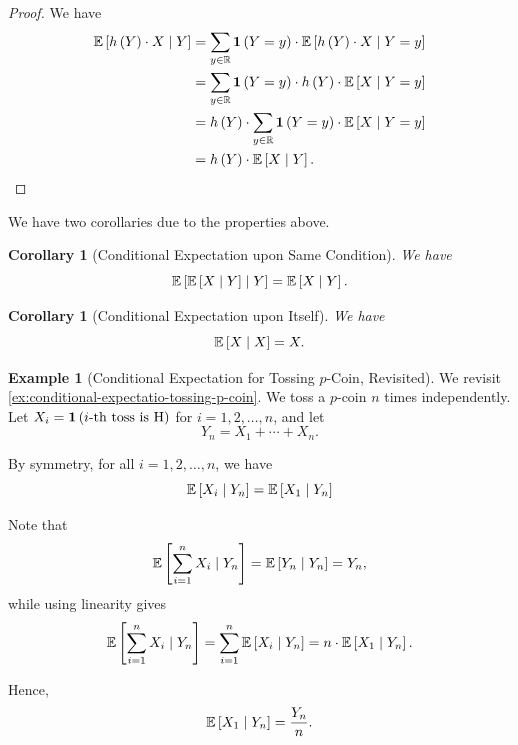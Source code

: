 \documentclass{article}
\newtheorem{corollary}[theorem]{Corollary}
\theoremstyle{definition}
\newtheorem{example}[theorem]{Example}
\theoremstyle{remark}
\newcommand{\RR}{\mathbb{R}}
\newcommand{\Expt}{\mathbb{E}}
\newcommand{\Conditional}[2]{#1\mid #2}
\newcommand{\indicator}{\mathbf{1}}
\begin{document}
\begin{proof}
    We have
    \begin{align*}
        \Expt\bqty{\Conditional{h\pqty{Y} \cdot X}{Y}} &= \sum_{y \in \RR} \indicator\pqty{Y = y} \cdot \Expt\bqty{\Conditional{h\pqty{Y} \cdot X}{Y = y}} \\
        &= \sum_{y \in \RR} \indicator\pqty{Y = y} \cdot h\pqty{Y} \cdot \Expt\bqty{\Conditional{X}{Y = y}} \\
        &= h\pqty{Y} \cdot \sum_{y \in \RR} \indicator\pqty{Y = y} \cdot \Expt\bqty{\Conditional{X}{Y = y}} \\
        &= h\pqty{Y} \cdot \Expt\bqty{\Conditional{X}{Y}}.
    \end{align*}
\end{proof}

We have two corollaries due to the properties above.

\begin{corollary}[Conditional Expectation upon Same Condition]
    \label{cor:conditional-expecation-upon-same-condition}%
    We have
    \[
        \Expt\bqty{\Conditional{\Expt\bqty{\Conditional{X}{Y}}}{Y}} = \Expt\bqty{\Conditional{X}{Y}}.
    \]
\end{corollary}

\begin{corollary}[Conditional Expectation upon Itself]
    \label{cor:conditional-expectation-upon-itself}%
    We have
    \[
        \Expt\bqty{\Conditional{X}{X}} = X.
    \]    
\end{corollary}

\begin{example}[Conditional Expectation for Tossing \(p\)-Coin, Revisited]
    \label{ex:conditional-expectatio-tossing-p-coin-revisited}%
    We revisit \autoref{ex:conditional-expectatio-tossing-p-coin}. We toss a \(p\)-coin \(n\) times independently. Let \(X_i = \indicator\pqty{i\text{-th toss is H}}\) for \(i = 1, 2, \ldots, n\), and let
    \[
        Y_n = X_1 + \cdots + X_n.
    \]

    By symmetry, for all \(i = 1, 2, \ldots, n\), we have
    \[
        \Expt\bqty{\Conditional{X_i}{Y_n}} = \Expt\bqty{\Conditional{X_1}{Y_n}}
    \]

    Note that
    \[
        \Expt\bqty{\Conditional{\sum_{i = 1}^{n} X_i}{Y_n}} = \Expt\bqty{\Conditional{Y_n}{Y_n}} = Y_n,
    \]
    while using linearity gives
    \[
        \Expt\bqty{\Conditional{\sum_{i = 1}^{n} X_i}{Y_n}} = \sum_{i = 1}^{n} \Expt\bqty{\Conditional{X_i}{Y_n}} = n \cdot \Expt\bqty{\Conditional{X_1}{Y_n}}.
    \]

    Hence,
    \[
        \Expt\bqty{\Conditional{X_1}{Y_n}} = \frac{Y_n}{n}.
    \]
\end{example}
\end{document}
